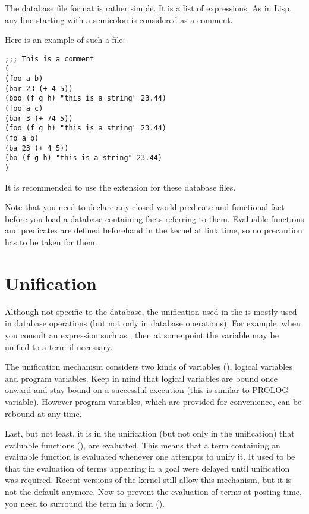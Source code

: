 The database file format is rather simple. It is a list of expressions. As in
Lisp, any line starting with a semicolon \samp{;} is considered as a comment.

Here is an example of such a file:
\begin{verbatim}
;;; This is a comment
(
(foo a b)
(bar 23 (+ 4 5))
(boo (f g h) "this is a string" 23.44)
(foo a c)
(bar 3 (+ 74 5))
(foo (f g h) "this is a string" 23.44)
(fo a b)
(ba 23 (+ 4 5))
(bo (f g h) "this is a string" 23.44)
)
\end{verbatim}

It is recommended to use the  extension for these database files.

Note that you need to declare any closed world predicate and functional
fact before you load a database containing facts referring to them.
Evaluable functions and predicates are defined beforehand in the kernel at
link time, so no precaution has to be taken for them.

\section{Unification}

Although not specific to the database, the unification used in the \CPK{} is
mostly used in database operations (but not only in database operations). For
example, when you consult an expression such as , then at some
point the  variable may be unified to a term if necessary.

The unification mechanism considers two kinds of variables
(), logical variables and program variables. Keep in mind that
logical variables are bound once onward and stay bound on a successful
execution (this is similar to PROLOG variable). However program variables,
which are provided for convenience, can be rebound at any time.

Last, but not least, it is in the unification (but not only in the unification)
that evaluable functions (), are evaluated.  This
means that a term containing an evaluable function is evaluated whenever one
attempts to unify it. It used to be that the evaluation of terms appearing in a
goal were delayed until unification was required.  Recent versions of the kernel
still allow this mechanism, but it is not the default anymore. Now to prevent
the evaluation of terms at posting time, you need to surround the term in a
 form ().

